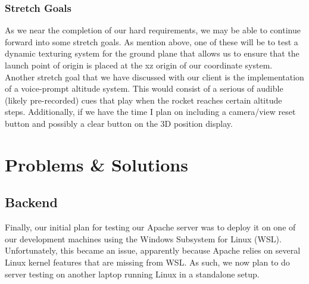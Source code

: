 \documentclass[journal,10pt,onecolumn,compsoc]{IEEEtran}
\begin{document}
		\subsubsection{Stretch Goals}
			As we near the completion of our hard requirements, we may be able to continue forward into some stretch goals.
			As mention above, one of these will be to test a dynamic texturing system for the ground plane that allows us to ensure that the launch point of origin is placed at the xz origin of our coordinate system.
			Another stretch goal that we have discussed with our client is the implementation of a voice-prompt altitude system.
			This would consist of a serious of audible (likely pre-recorded) cues that play when the rocket reaches certain altitude steps.
			Additionally, if we have the time I plan on including a camera/view reset button and possibly a clear button on the 3D position display.
\newpage


\section{Problems \& Solutions}

	\subsection{Backend}
	
		Finally, our initial plan for testing our Apache server	was to deploy it on one of our development machines using the Windows Subsystem for Linux (WSL).
		Unfortunately, this became an issue, apparently because Apache relies on several Linux kernel features that are missing from WSL.
		As such, we now plan to do server testing on another laptop running Linux in a standalone setup.
	
\end{document}
